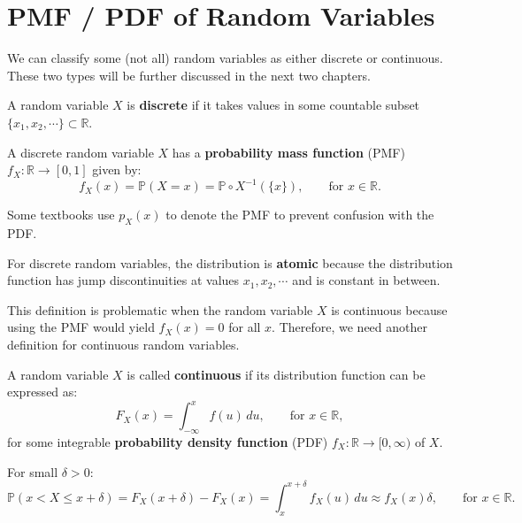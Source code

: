 \documentclass{huhtakm-template-book-v2}
\newcommand{\prob}{\mathbb{P}}
\begin{document}
\section{PMF / PDF of Random Variables}
    We can classify some (not all) random variables as either discrete or continuous. These two types will be further discussed in the next two chapters.
    \begin{defn}
        A random variable $X$ is \textbf{discrete} if it takes values in some countable subset $\{x_{1},x_{2},\cdots\}\subset\mathbb{R}$.
    \end{defn}
    \begin{defn}
        A discrete random variable $X$ has a \textbf{probability mass function} (PMF) $f_{X}:\mathbb{R} \to [0,1]$ given by: 
        \begin{equation*}
            f_{X}(x) = \prob(X = x) = \prob \circ X^{-1}(\{x\}), \qquad\text{for }x \in \mathbb{R}.
        \end{equation*}
    \end{defn}
    \begin{rem}
        Some textbooks use $p_{X}(x)$ to denote the PMF to prevent confusion with the PDF.
    \end{rem}
    \begin{rem}
        For discrete random variables, the distribution is \textbf{atomic} because the distribution function has jump discontinuities at values $x_{1},x_{2},\cdots$ and is constant in between.
    \end{rem}
    This definition is problematic when the random variable $X$ is continuous because using the PMF would yield $f_{X}(x) = 0$ for all $x$. Therefore, we need another definition for continuous random variables.
    \begin{defn}
        A random variable $X$ is called \textbf{continuous} if its distribution function can be expressed as:
        \begin{equation*}
            F_{X}(x) = \int_{-\infty}^{x}f(u)\,du, \qquad\text{for }x \in \mathbb{R},
        \end{equation*}
        for some integrable \textbf{probability density function} (PDF) $f_{X}:\mathbb{R} \to [0,\infty)$ of $X$. 
    \end{defn}
    \begin{rem}
        For small $\delta > 0$:
        \begin{equation*}
            \prob(x < X \leq x+\delta) = F_{X}(x+\delta)-F_{X}(x) = \int_{x}^{x+\delta}f_{X}(u)\,du \approx f_{X}(x)\delta, \qquad\text{for }x \in \mathbb{R}.
        \end{equation*}
    \end{rem}
\end{document}

